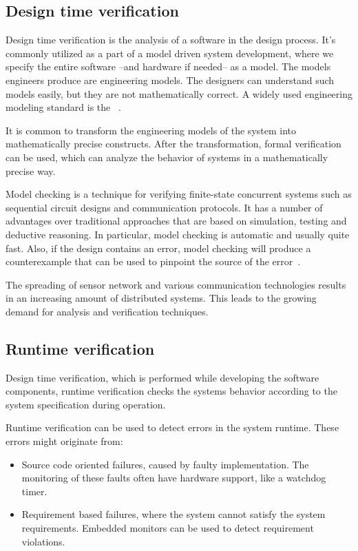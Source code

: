 \subsection{Design time verification}

Design time verification is the analysis of a software in the design process. It's commonly utilized as a part of a model driven system development, where we specify the entire software --and hardware if needed-- as a model.
The models engineers produce are engineering models. The designers can understand such models easily, but they are not mathematically correct. A widely used engineering modeling standard is the \uml{}~\cite{UML}.

It is common to transform the engineering models of the system into mathematically precise constructs. After the transformation, formal verification can be used, which can analyze the behavior of systems in a mathematically precise way.

Model checking is a technique for verifying finite-state concurrent systems such as sequential circuit designs and communication protocols. It has a number of advantages over traditional approaches that are based on simulation, testing and deductive reasoning. In particular, model checking is automatic and usually quite fast. Also, if the design contains an error, model checking will produce a counterexample that can be used to pinpoint the source of the error~\cite{mcmillan1993symbolic}.

The spreading of sensor network and various communication technologies results in an increasing amount of distributed systems. This leads to the growing demand for analysis and verification techniques.

\subsection{Runtime verification}

Design time verification, which is performed while developing the software components, runtime verification checks the systems behavior according to the system specification during operation.

Runtime verification can be used to detect errors in the system runtime. These errors might originate from:
\begin{itemize}
	\item Source code oriented failures, caused by faulty implementation. The monitoring of these faults often have hardware support, like a watchdog timer.
	\item Requirement based failures, where the system cannot satisfy the system requirements. Embedded monitors can be used to detect requirement violations.
\end{itemize}

